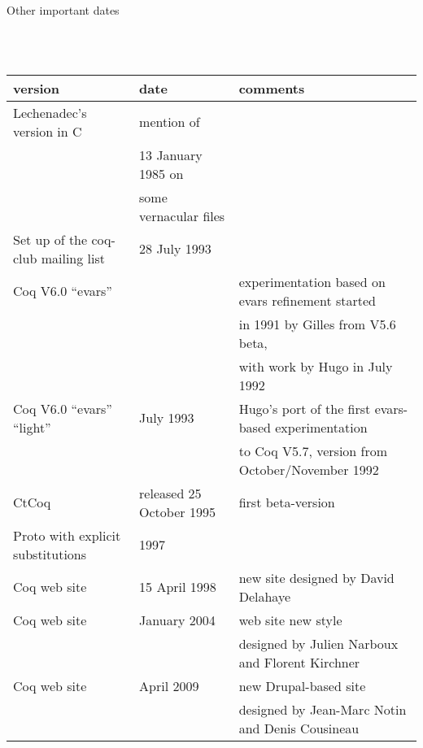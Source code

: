 \documentclass[a4paper]{book}
\begin{document}
\centerline{\large Other important dates}
\mbox{}\\
\mbox{}\\
\begin{tabular}{l|l|l}
version & date & comments \\
\hline
Lechenadec's version in C& mention of \\
 & 13 January 1985 on \\
 & some vernacular files\\
Set up of the coq-club mailing list & 28 July 1993\\

Coq V6.0 ``evars'' & & experimentation based on evars
refinement started \\
  & & in 1991 by Gilles from V5.6 beta,\\
  & & with work by Hugo in July 1992\\

Coq V6.0 ``evars'' ``light'' & July 1993 & Hugo's port of the first
evars-based experimentation \\
 & & to Coq V5.7, version from October/November
1992\\

CtCoq & released 25 October 1995 & first beta-version  \\ %

Proto with explicit substitutions & 1997 &\\

Coq web site & 15 April 1998 & new site designed by David Delahaye \\

Coq web site & January 2004 & web site new style \\
  & & designed by Julien Narboux and Florent Kirchner \\

Coq web site & April 2009 & new Drupal-based site \\
  & & designed by Jean-Marc Notin and Denis Cousineau \\

\end{tabular}
\end{document}
